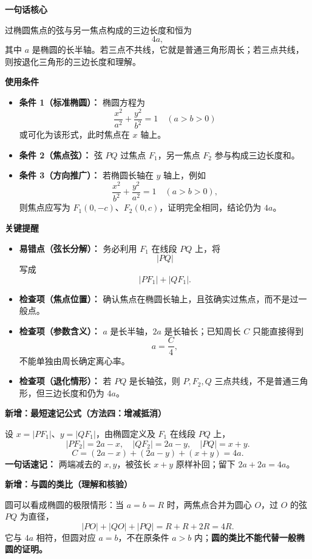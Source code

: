 \begin{summarybox}
	\textbf{\textcolor{CSummary}{一句话核心}}

	过椭圆焦点的弦与另一焦点构成的三边长度和恒为
	\[
		4a,
	\]
	其中 $a$ 是椭圆的长半轴。若三点不共线，它就是普通三角形周长；若三点共线，则按退化三角形的三边长度和理解。

	\medskip
	\textbf{\textcolor{CSummary}{使用条件}}
	\begin{itemize}[leftmargin=*, itemsep=0.5em, topsep=0.4em]
		\item \textbf{条件 1（标准椭圆）：} 椭圆方程为
		      \[
			      \frac{x^2}{a^2}+\frac{y^2}{b^2}=1\quad (a>b>0)
		      \]
		      或可化为该形式，此时焦点在 $x$ 轴上。

		\item \textbf{条件 2（焦点弦）：} 弦 $PQ$ 过焦点 $F_1$，另一焦点 $F_2$ 参与构成三边长度和。

		\item \textbf{条件 3（方向推广）：} 若椭圆长轴在 $y$ 轴上，例如
		      \[
			      \frac{x^2}{b^2}+\frac{y^2}{a^2}=1\quad (a>b>0),
		      \]
		      则焦点应写为 $F_1(0,-c)$、$F_2(0,c)$，证明完全相同，结论仍为 $4a$。
	\end{itemize}

	\medskip
	\textbf{\textcolor{CSummary}{关键提醒}}
	\begin{itemize}[leftmargin=*, itemsep=0.5em, topsep=0.4em]
		\item \textbf{易错点（弦长分解）：} 务必利用 $F_1$ 在线段 $PQ$ 上，将
		      \[
			      |PQ|
		      \]
		      写成
		      \[
			      |PF_1|+|QF_1|.
		      \]

		\item \textbf{检查项（焦点位置）：} 确认焦点在椭圆长轴上，且弦确实过焦点，而不是过一般点。

		\item \textbf{检查项（参数含义）：} $a$ 是长半轴，$2a$ 是长轴长；已知周长 $C$ 只能直接得到
		      \[
			      a=\frac{C}{4},
		      \]
		      不能单独由周长确定离心率。

		\item \textbf{检查项（退化情形）：} 若 $PQ$ 是长轴弦，则 $P,F_2,Q$ 三点共线，不是普通三角形，但三边长度和仍为 $4a$。
	\end{itemize}


\medskip
\textbf{\textcolor{CSummary}{新增：最短速记公式（方法四：增减抵消）}}

设 $x=|PF_1|$、$y=|QF_1|$，由椭圆定义及 $F_1$ 在线段 $PQ$ 上，
\[
 |PF_2|=2a-x,\quad |QF_2|=2a-y,\quad |PQ|=x+y.
\]
\[
 \boxed{C=(2a-x)+(2a-y)+(x+y)=4a.}
\]
\textbf{一句话速记：} 两端减去的 $x,y$，被弦长 $x+y$ 原样补回；留下 $2a+2a=4a$。

\medskip
\textbf{\textcolor{CSummary}{新增：与圆的类比（理解和核验）}}

圆可以看成椭圆的极限情形：当 $a=b=R$ 时，两焦点合并为圆心 $O$，过 $O$ 的弦 $PQ$ 为直径，
\[
 |PO|+|QO|+|PQ|=R+R+2R=4R.
\]
它与 $4a$ 相符，但圆对应 $a=b$，不在原条件 $a>b$ 内；\textbf{圆的类比不能代替一般椭圆的证明。}
\end{summarybox}